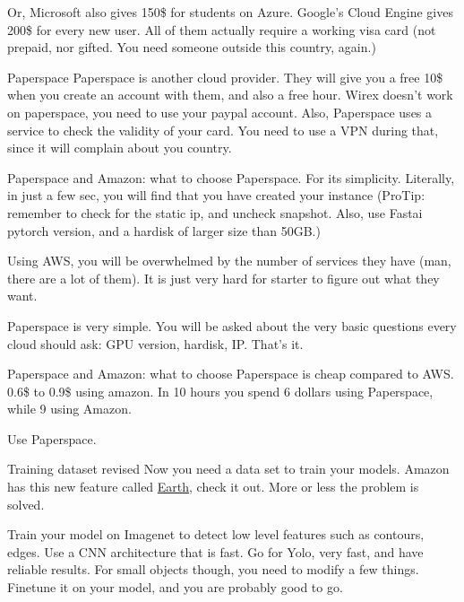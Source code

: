 \documentclass{beamer}
\begin{document}
\begin{frame}{Or,}
  Microsoft also gives 150\$ for students on Azure. Google's Cloud Engine gives
  200\$ for every new user. All of them actually require a working visa card
  (not prepaid, nor gifted. You need someone outside this country, again.)
\end{frame}

\begin{frame}{Paperspace}
  Paperspace is another cloud provider. They will give you a free 10\$ when you
  create an account with them, and also a free hour. Wirex doesn't work on
  paperspace, you need to use your paypal account. Also, Paperspace uses a
  service to check the validity of your card. You need to use a VPN during that,
  since it will complain about you country.
\end{frame}

\begin{frame}{Paperspace and Amazon: what to choose}
  Paperspace. For its simplicity. Literally, in just a few sec, you will find
  that you have created your instance (ProTip: remember to check for the static ip, and
  uncheck snapshot. Also, use Fastai pytorch version, and a hardisk of larger
  size than 50GB.)

  Using AWS, you will be overwhelmed by the number of services they have (man,
  there are a lot of them). It is just very hard for starter to figure out what
  they want.

  Paperspace is very simple. You will be asked about the very basic questions
  every cloud should ask: GPU version, hardisk, IP. That's it.
\end{frame}

\begin{frame}{Paperspace and Amazon: what to choose}
  Paperspace is cheap compared to AWS. 0.6\$ to 0.9\$ using amazon. In 10 hours
  you spend 6 dollars using Paperspace, while 9 using Amazon.

  Use Paperspace.
\end{frame}

\begin{frame}{Training dataset revised}
  Now you need a data set to train your models. Amazon has this new feature
  called \href{https://aws.amazon.com/earth/}{Earth}, check it out. More or less
  the problem is solved.

  Train your model on Imagenet to detect low level features such as contours,
  edges. Use a CNN architecture that is fast. Go for Yolo, very fast, and have
  reliable results. For small objects though, you need to modify a few things.
  Finetune it on your model, and you are probably good to go.

\end{frame}
\end{document}
